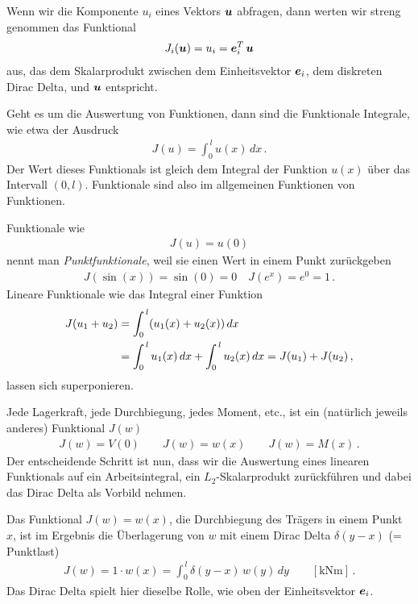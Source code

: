 Wenn wir die Komponente $u_i$ eines Vektors $\mbox{\boldmath $u$}$ abfragen, dann werten wir streng genommen das Funktional
\begin{align}
J_i(\mbox{\boldmath $u$}) = u_i = \mbox{\boldmath $e$}_i^T\,\mbox{\boldmath $u$}
\end{align}
aus, das dem Skalarprodukt zwischen dem Einheitsvektor $\mbox{\boldmath $e$}_i$, dem diskreten Dirac Delta, und $\mbox{\boldmath $u$}$ entspricht.

Geht es um die Auswertung von Funktionen, dann sind die Funktionale Integrale, wie etwa der Ausdruck
\begin{align} \label{Eq43}
J(u) = \int_0^{\,l} u(x)\,dx\,.
\end{align}
Der Wert dieses Funktionals ist gleich dem Integral der Funktion $ u(x) $ \"{u}ber das Intervall $(0,l)$.
Funktionale sind also im allgemeinen Funktionen von Funktionen.

Funktionale wie
\begin{align}
J(u) = u(0)
\end{align}
nennt man {\em Punktfunktionale\/}, weil sie einen Wert in einem Punkt zur\"{u}ckgeben
\begin{align}
J(\sin(x)) = \sin(0) = 0 \quad J(e^x) = e^0 = 1\,.
\end{align}
Lineare Funktionale wie das Integral einer Funktion
\begin{align}
J(u_1 + u_2) &= \int_0^{\,l} (u_1(x) + u_2(x))\,dx \nonumber \\
& = \int_0^{\,l} u_1(x)\,dx + \int_0^{\,l} u_2(x)\,dx = J(u_1) + J(u_2)\,,
\end{align}
lassen sich \glq superponieren\grq{}.

Jede Lagerkraft, jede Durchbiegung, jedes Moment, etc., ist ein (nat\"{u}rlich jeweils anderes) Funktional $J(w)$
\begin{align}\label{Eq20}
J(w) = V(0) \qquad J(w) = w(x) \qquad J(w) = M(x)\,.
\end{align}
Der entscheidende Schritt ist nun, dass wir die Auswertung eines linearen Funktionals auf ein Arbeitsintegral, ein $L_2$-Skalarprodukt zur\"{u}ckf\"{u}hren und dabei das Dirac Delta als Vorbild nehmen.

Das Funktional $J(w) = w(x)$, die Durchbiegung des Tr\"{a}gers in einem Punkt $x$, ist im Ergebnis die \"{U}berlagerung von $w$ mit einem Dirac Delta $\delta(y-x)$ (= Punktlast)
\begin{align}\label{Eq125}
J(w) = 1 \cdot w(x) = \int_0^{\,l} \delta(y-x)\,w(y)\,dy \qquad [\text{kNm}]\,.
\end{align}
Das Dirac Delta spielt hier dieselbe Rolle, wie oben der Einheitsvektor $\mbox{\boldmath $e$}_i$.


